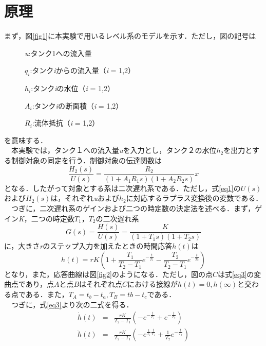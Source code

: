 \documentclass[11pt,a4paper]{jsarticle}
\begin{document}
 \section{原理}
 まず，図\ref{fig1}に本実験で用いるレベル系のモデルを示す．ただし，図の記号は
 \begin{description}
  \item[] {\it u}:タンク1への流入量 
  \item[] $q_i$:タンク{\it i}からの流入量（{\it i} = 1,2）
  \item[] $h_i$:タンク{\it i}の水位（{\it i} = 1,2）
  \item[] $A_i$:タンク{\it i}の断面積（{\it i} = 1,2）
  \item[] $R_i$:流体抵抗（{\it i} = 1,2） 
 \end{description}
 を意味する． \\
 　本実験では，タンク１への流入量{\it u}を入力とし，タンク２の水位$h_2$を出力とする制御対象の同定を行う．制御対象の伝達関数は
 \begin{equation}
  \frac{H_2(s)}{U(s)} = \frac{R_2}{(1 + A_1 R_1 s)(1 + A_2 R_2 s)}
   \label{eq1}
x \end{equation}
 となる．したがって対象とする系は二次遅れ系である．ただし，式\ref{eq1}の$U(s)$および$H_2(s)$は，それぞれ{\it u}および$h_2$に対応するラプラス変換後の変数である． \\
　つぎに，二次遅れ系のゲインおよび二つの時定数の決定法を述べる．まず，ゲイン{\it K}，二つの時定数$T_1，T_2$の二次遅れ系
\begin{equation}
 G(s) = \frac{H(s)}{U(s)} = \frac{K}{(1 + T_1 s)(1 + T_2 s)}
\end{equation} 
 に，大きさ{\it r}のステップ入力を加えたときの時間応答$h(t)$は
\begin{equation}
 h(t) = rK(1+\frac{T_1}{T_2 - T_1} e^{-\frac{t}{T_1}} - \frac{T_2}{T_2 - T_1} e^{-\frac{t}{T_2}} )
\label{eq3}
\end{equation}
となり，また，応答曲線は図\ref{fig2}のようになる．ただし，図の点$C$は式\ref{eq3}の変曲点であり，点$A$と点$B$はそれぞれ点$C$における接線が$h(t) = 0, h(\infty)$と交わる点である．また，$T_A = t_b - t_a,T_B = tb - t_c$である．\\
　つぎに，式\ref{eq3}より次の二式を得る．
\begin{eqnarray}
 {\dot h(t)} & = & \frac{rK}{T_2 - T_1}(-e^{-\frac{t}{T_1}} + e^{-\frac{t}{T_2}}) \\ \label{eq4}
 {\ddot h(t)} & = & \frac{rK}{T_2 - T_1}(-e^{\frac{1}{T_1} \frac{t}{T_1}} + \frac{1}{T_2} e^{-\frac{t}{T_2}})
\end{eqnarray}
\end{document}
